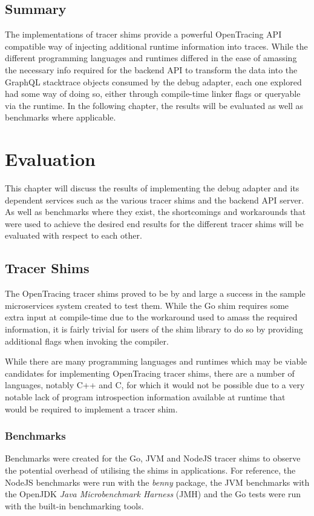 \documentclass[12pt,pdftex,titlepage]{report}
\begin{document}
        \section{Summary}
            The implementations of tracer shims provide a powerful OpenTracing API compatible way of injecting additional runtime information into traces. While the different programming languages and 
            runtimes differed in the ease of amassing the necessary info required for the backend API to transform the data into the GraphQL stacktrace objects consumed by the debug adapter, each one 
            explored had some way of doing so, either through compile-time linker flags or queryable via the runtime. In the following chapter, the results will be evaluated as well as benchmarks
            where applicable.
            
                    
    \chapter{Evaluation}
        This chapter will discuss the results of implementing the debug adapter and its dependent services such as the various tracer shims and the backend API server. As well as benchmarks where
        they exist, the shortcomings and workarounds that were used to achieve the desired end results for the different tracer shims will be evaluated with respect to each other.

        \bigskip
        \section{Tracer Shims}
            The OpenTracing tracer shims proved to be by and large a success in the sample microservices system created to test them. While the Go shim requires some extra input at compile-time due to the
            workaround used to amass the required information, it is fairly trivial for users of the shim library to do so by providing additional flags when invoking the compiler.

            While there are many programming languages and runtimes which may be viable candidates for implementing OpenTracing tracer shims, there are a number of languages, notably C++ and C, for which 
            it would not be possible due to a very notable lack of program introspection information available at runtime that would be required to implement a tracer shim.

            \subsection{Benchmarks}
            \label{sec:bench}
                Benchmarks were created for the Go, JVM and NodeJS tracer shims to observe the potential overhead of utilising the shims in applications. For reference, the NodeJS benchmarks were run with 
                the \textit{benny} package\cite{benny}, the JVM benchmarks with the OpenJDK \textit{Java Microbenchmark Harness} (JMH)\cite{jmh} and the Go tests were run with the built-in benchmarking 
                tools\cite{golangbench}.
                
\end{document}
